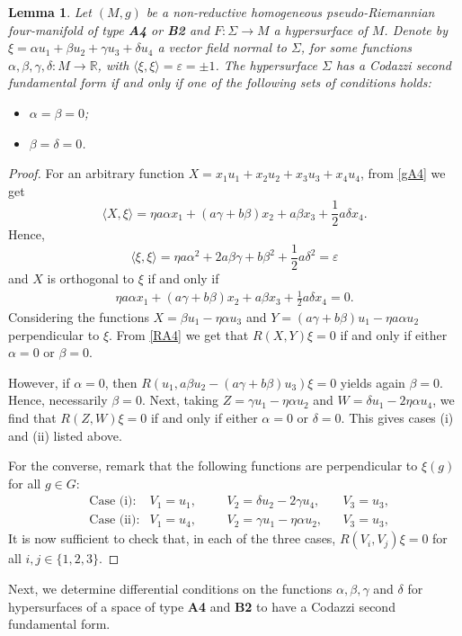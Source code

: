 \documentclass{amsart}
\theoremstyle{plain}
\newtheorem{lemma}{Lemma}
\theoremstyle{remark}
\def\R{\mathbb{R}}
\begin{document}
{\begin{lemma} \label{necA4}
Let $(M,g)$ be a non-reductive homogeneous pseudo-Riemannian four-manifold of type {\rm\bf A4} or {\rm\bf B2} and $F : \Sigma \to M$ a hypersurface of $M$. Denote by $\xi=\alpha u_1+\beta u_2+\gamma u_3+\delta u_4$ a vector field normal to $\Sigma$, for some functions $\alpha, \beta, \gamma, \delta : M \to \R$, with $\langle \xi,\xi \rangle =\varepsilon=\pm 1$. The hypersurface $\Sigma$ has a Codazzi second fundamental form if and only if one of the following sets of conditions holds: 
%
\begin{itemize}
\item[(i)] $\alpha=\beta=0$; 
\item[(ii)]  $\beta=\delta=0$.
\end{itemize}
\end{lemma}
\begin{proof} For an arbitrary function $X=x_1u_1+x_2u_2+x_3u_3+x_4u_4$, from \eqref{gA4} we get 
%
\[\langle X,\xi\rangle= \eta a \alpha x_1+(a\gamma +b\beta)x_2+ a\beta x_3+\frac 12 a\delta x_4.\]
%
Hence,
\begin{equation}\label{nxiA4}
\langle \xi,\xi\rangle= \eta a \alpha^2 +2a\beta\gamma +b\beta^2+\frac 12 a \delta^2=\varepsilon
\end{equation}
%
and $X$ is orthogonal to $\xi$ if and only if 
%
\[\begin{array}{l}
\eta a \alpha x_1+(a\gamma +b\beta)x_2+ a\beta x_3+\frac 12 a\delta x_4=0.
\end{array}
\]
%
Considering the functions $X=\beta u_1 - \eta\alpha u_3$ and $Y=(a\gamma+b\beta) u_1 - \eta a\alpha u_2$ perpendicular to $\xi$. From  \eqref{RA4} we get that $R(X,Y)\xi=0$ if and only if either $\alpha=0$ or $\beta=0$.  

However, if $\alpha=0$, then $R(u_1,a\beta u_2-(a\gamma+b\beta)u_3)\xi=0$ yields again $\beta=0$. Hence, necessarily $\beta=0$. Next, taking $Z=\gamma u_1 -\eta\alpha u_2$ and $W=\delta u_1-2\eta\alpha u_4$, we find that $R(Z,W)\xi=0$ if and only if either $\alpha=0$ or $\delta=0$. This gives cases (i) and (ii) listed above.

For the converse, remark that the following functions are perpendicular to $\xi(g)$ for all $g\in G$:
\begin{align}
& \mbox{Case (i)}: & V_1=u_1, &&& V_2=\delta u_2-2\gamma u_4, && V_3=u_3, \label{basisA4i} \\
& \mbox{Case (ii)}: & V_1=u_4, &&& V_2=\gamma u_1-\eta\alpha u_2, && V_3=u_3, \label{basisA4ii} 
\end{align}
It is now sufficient to check that, in each of the three cases, $R(V_i,V_j)\xi =0$ for all $i,j \in \{1,2,3\}$.
\end{proof}
Next, we determine differential conditions on the functions $\alpha,\beta,\gamma$ and $\delta$ for hypersurfaces of a space of type \textbf{A4} and \textbf{B2} to have a Codazzi second fundamental form.

}
\end{document}
